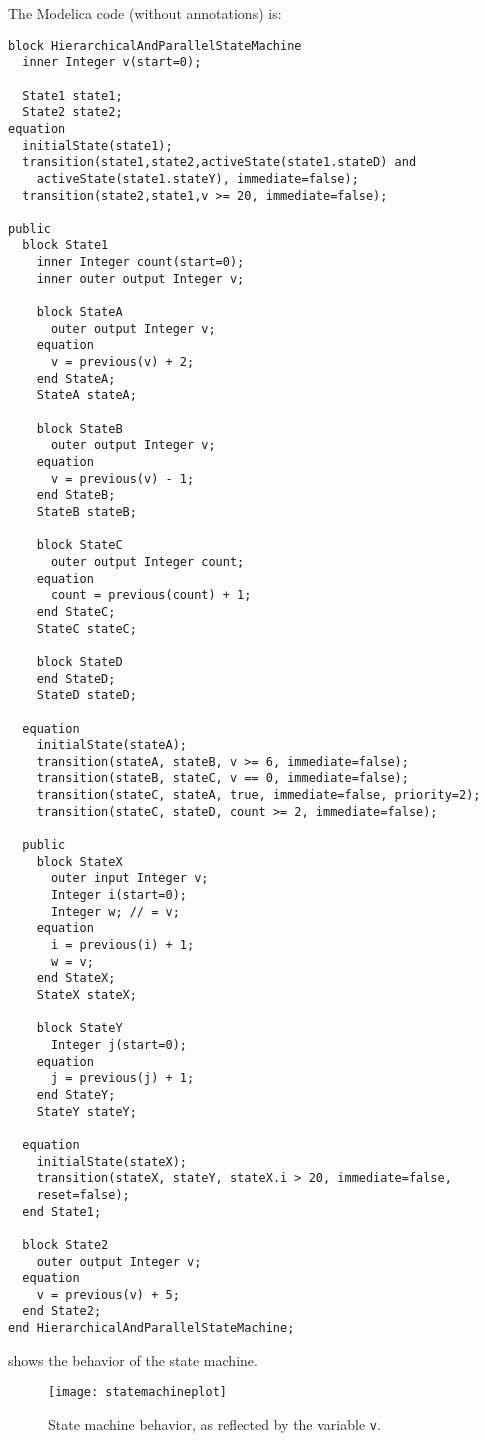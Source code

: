 \begin{example}
The Modelica code (without annotations) is:
\begin{lstlisting}[language=modelica]
block HierarchicalAndParallelStateMachine
  inner Integer v(start=0);

  State1 state1;
  State2 state2;
equation
  initialState(state1);
  transition(state1,state2,activeState(state1.stateD) and
    activeState(state1.stateY), immediate=false);
  transition(state2,state1,v >= 20, immediate=false);

public
  block State1
    inner Integer count(start=0);
    inner outer output Integer v;

    block StateA
      outer output Integer v;
    equation
      v = previous(v) + 2;
    end StateA;
    StateA stateA;

    block StateB
      outer output Integer v;
    equation
      v = previous(v) - 1;
    end StateB;
    StateB stateB;

    block StateC
      outer output Integer count;
    equation
      count = previous(count) + 1;
    end StateC;
    StateC stateC;

    block StateD
    end StateD;
    StateD stateD;

  equation
    initialState(stateA);
    transition(stateA, stateB, v >= 6, immediate=false);
    transition(stateB, stateC, v == 0, immediate=false);
    transition(stateC, stateA, true, immediate=false, priority=2);
    transition(stateC, stateD, count >= 2, immediate=false);

  public
    block StateX
      outer input Integer v;
      Integer i(start=0);
      Integer w; // = v;
    equation
      i = previous(i) + 1;
      w = v;
    end StateX;
    StateX stateX;

    block StateY
      Integer j(start=0);
    equation
      j = previous(j) + 1;
    end StateY;
    StateY stateY;

  equation
    initialState(stateX);
    transition(stateX, stateY, stateX.i > 20, immediate=false,
    reset=false);
  end State1;

  block State2
    outer output Integer v;
  equation
    v = previous(v) + 5;
  end State2;
end HierarchicalAndParallelStateMachine;
\end{lstlisting}

 shows the behavior of the state machine.
\begin{figure}[H]
  \begin{center}
    \texttt{[image: statemachineplot]}
  \end{center}
  \caption{State machine behavior, as reflected by the variable \lstinline!v!.}
  \label{fig:state-machine-behavior}
\end{figure}


\end{example}
